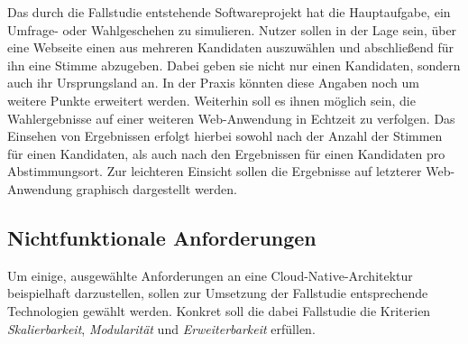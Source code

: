 Das durch die Fallstudie entstehende Softwareprojekt hat die Hauptaufgabe, ein Umfrage- oder Wahlgeschehen zu simulieren. Nutzer sollen in der Lage sein, über eine Webseite einen aus mehreren Kandidaten auszuwählen und abschließend für ihn eine Stimme abzugeben. Dabei geben sie nicht nur einen Kandidaten, sondern auch ihr Ursprungsland an. In der Praxis könnten diese Angaben noch um weitere Punkte erweitert werden.
Weiterhin soll es ihnen möglich sein, die Wahlergebnisse auf einer weiteren Web-Anwendung in Echtzeit zu verfolgen. Das Einsehen von Ergebnissen erfolgt hierbei sowohl nach der Anzahl der Stimmen für einen Kandidaten, als auch nach den Ergebnissen für einen Kandidaten pro Abstimmungsort. Zur leichteren Einsicht sollen die Ergebnisse auf letzterer Web-Anwendung graphisch dargestellt werden. 

\subsection{Nichtfunktionale Anforderungen}
Um einige, ausgewählte Anforderungen an eine Cloud-Native-Architektur beispielhaft darzustellen, sollen zur Umsetzung der Fallstudie entsprechende Technologien gewählt werden. Konkret soll die dabei Fallstudie die Kriterien \textit{Skalierbarkeit}, \textit{Modularität} und \textit{Erweiterbarkeit} erfüllen. 

